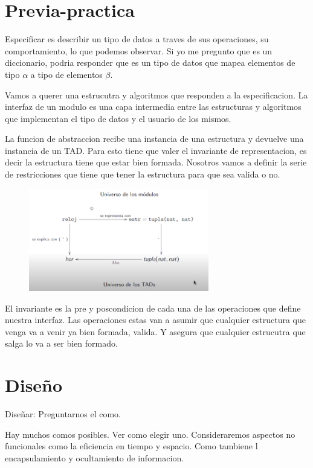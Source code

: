 \documentclass[11pt]{article}
\begin{document}
\tableofcontents

\section{Previa-practica}
Especificar es describir un tipo de datos a traves de sus operaciones, su comportamiento,
lo que podemos observar.
Si yo me pregunto que es un diccionario, podria responder que es un tipo de datos
que mapea elementos de tipo  $\alpha$ a tipo de elementos $\beta$.

Vamos a querer una estrucutra y algoritmos que responden a la especificacion.
La interfaz de un modulo es una capa intermedia entre las estructuras y algoritmos
que implementan el tipo de datos y el usuario de los mismos.

La funcion de abstraccion recibe una instancia de una estructura y devuelve una
instancia de un TAD.
Para esto tiene que valer el invariante de representacion, es decir
la estructura tiene que estar bien formada.
Nosotros vamos a definir la serie de restricciones que tiene que tener la estructura
para que sea valida o no.

\begin{figure}[h!]
    \centering
    \includegraphics[width=0.7\textwidth]{absres.png}
\end{figure}

El invariante es la pre y poscondicion de cada una de las operaciones que define
nuestra interfaz.
Las operaciones estas van a asumir que cualquier estructura que venga va a venir
ya bien formada, valida.
Y asegura que cualquier estrucutra que salga lo va a ser bien formado.


\section{Dise\~no}
Diseñar: Preguntarnos el como.

Hay muchos comos posibles. Ver como elegir uno.
Consideraremos aspectos no funcionales como la eficiencia en tiempo y espacio.
Como tambiene l encapsulamiento y ocultamiento de informacion.
\end{document}

